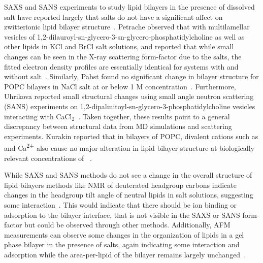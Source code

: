 SAXS and SANS experiments to study lipid bilayers in the presence of dissolved salt have reported
largely that salts do not have a significant affect on zwitterionic lipid bilayer 
structure~\cite{pabst:2007,petrache:2006:swelling,uhrikova:2008,kurakin:2021:effect}.
Petrache \etal{} observed that with multilamellar vesicles of 1,2-dilauroyl-sn-glycero-3-sn-glycero-phosphatidylcholine 
as well as other lipids in KCl and BrCl salt solutions, 
and reported that while small changes can be seen in the
X-ray scattering form-factor due to the 
salts, 
the fitted electron density profiles are essentially identical for
systems with and without 
salt~\cite{petrache:2006:swelling}. 
Similarly, Pabst \etal{} found no significant change in bilayer structure 
for POPC bilayers in NaCl salt at or below 1 M concentration~\cite{pabst:2007}.
Furthermore, Uhrikova \etal{} reported small structural changes using small angle neutron scattering
(SANS) experiments on 1,2-dipalmitoyl-sn-glycero-3-phosphatidylcholine 
vesicles interacting with CaCl$_{2}$~\cite{uhrikova:2008}. 
Taken together, these results point to a general discrepancy between structural data 
from MD simulations and scattering experiments.
Kurakin \etal{} reported that in bilayers of POPC, divalent cations such as \mg and Ca\textsuperscript{2+} also cause
no major alteration in lipid bilayer structure at biologically relevant concentrations of \mg~\cite{kurakin:2021:effect}.

While SAXS and SANS methods do not see a change in the overall structure of lipid bilayers methods like NMR of deuterated headgroup carbons 
indicate changes in the headgroup tilt angle of neutral lipids in salt solutions, suggesting some interaction~\cite{akutsu:1981,seelig:1987}. 
This would indicate that there should be ion binding or adsorption to the bilayer interface, that is not visible in the SAXS or SANS form-factor but 
could be observed through other methods. Additionally, AFM measurements can observe some changes in the organization of lipids in a 
gel phase bilayer in the presence of salts, again indicating some interaction 
and adsorption while the area-per-lipid of the bilayer remains largely unchanged~\cite{ferber:2011:direct}.

